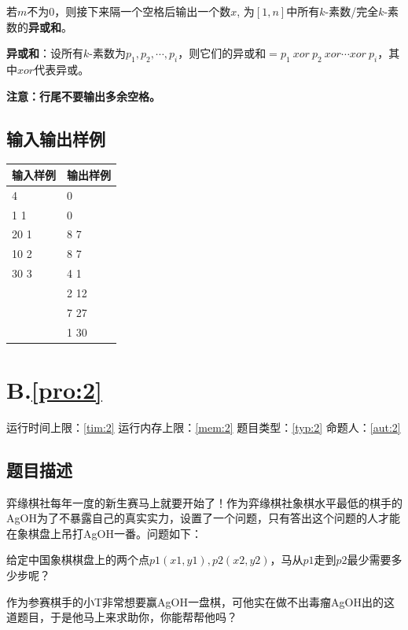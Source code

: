 \documentclass[
	lang=cn,
	color=green
]{elegantbook}
\begin{document}
若$m$不为$0$，则接下来隔一个空格后输出一个数$x$, 为$[1,n]$中所有$k$-素数/完全$k$-素数的\textbf{异或和}。

\begin{remark}
	\hspace{0.15cm} \textbf{异或和}：设所有$k$-素数为$p_1,p_2, \cdots , p_i$，则它们的异或和$=p_1 \ xor \ p_2 \ xor  \cdots xor \ p_i$，其中$xor$代表异或。
\end{remark}

\textbf{注意：行尾不要输出多余空格。}

\section*{输入输出样例}
\begin{tabularx}{450pt}{X|X}
	\toprule
	输入样例 & 输出样例 \\
	\midrule
	4        & 0        \\
	1 1      & 0        \\
	20 1     & 8 7      \\
	10 2     & 8 7      \\
	30 3     & 4 1      \\
	         & 2 12     \\
	         & 7 27     \\
	         & 1 30     \\
	\bottomrule
\end{tabularx}

\newpage
\chapter*{B.\quad \ref*{pro:2}}
\begin{center}
	运行时间上限：\ref*{tim:2} \quad 运行内存上限：\ref*{mem:2} \quad 题目类型：\ref*{typ:2} \quad 命题人：\ref*{aut:2}
\end{center}

\section*{题目描述}
弈缘棋社每年一度的新生赛马上就要开始了！作为弈缘棋社象棋水平最低的棋手的AgOH为了不暴露自己的真实实力，设置了一个问题，只有答出这个问题的人才能在象棋盘上吊打AgOH一番。问题如下：

给定中国象棋棋盘上的两个点$p1(x1,y1),p2(x2,y2)$，马从$p1$走到$p2$最少需要多少步呢？

作为参赛棋手的小T非常想要赢AgOH一盘棋，可他实在做不出毒瘤AgOH出的这道题目，于是他马上来求助你，你能帮帮他吗？
\end{document}

